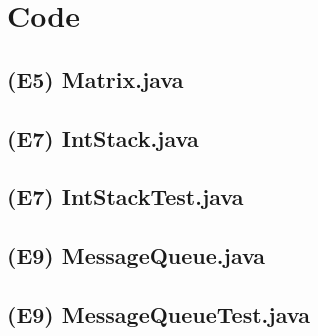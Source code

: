 \documentclass[main.tex]{subfiles}
\begin{document}
\section*{Code}

\subsection*{(E5) Matrix.java}


\subsection*{(E7) IntStack.java}


\subsection*{(E7) IntStackTest.java}


\subsection*{(E9) MessageQueue.java}


\subsection*{(E9) MessageQueueTest.java}

\end{document}

